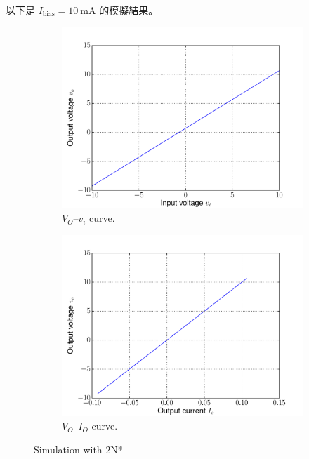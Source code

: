 \documentclass[12pt, a4paper]{article}
\begin{document}
\begin{enumerate}[itemsep=20pt, topsep=10pt]
\begin{figure}[H]
    \end{figure}
    以下是 $I_{\text{bias}} = \SI{10}\mA$ 的模擬結果。
    \begin{figure}[H]
      \begin{subfigure}{0.48\textwidth}
        \centering
        \includegraphics[width=\textwidth]{ngspice/p2vv.pdf}
        \caption{$V_O\text{--}v_i$ curve.}
      \end{subfigure}%
      \begin{subfigure}{0.48\textwidth}
        \centering
        \includegraphics[width=\textwidth]{ngspice/p2iv.pdf}
        \caption{$V_O\text{--}I_O$ curve.}
      \end{subfigure}
    \caption{Simulation with 2N*}

\end{figure}
\end{enumerate}
\end{document}
